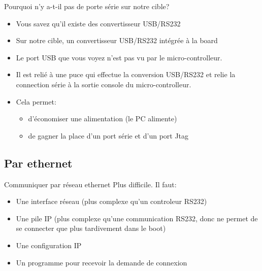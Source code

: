 \begin{frame}{Pourquoi n'y a-t-il pas de porte série sur notre cible?}
  \begin{itemize}
  \item Vous savez qu'il existe des convertisseur USB/RS232
  \item  Sur notre  cible, un  convertisseur USB/RS232  intégrée  à la
    board
  \item   Le  port  USB   que  vous   voyez  n'est   pas  vu   par  le
    micro-controlleur.
  \item Il est  relié à une puce qui  effectue la conversion USB/RS232
    et   relie  la   connection   série  à   la   sortie  console   du
    micro-controlleur.
  \item Cela permet:
    \begin{itemize}
    \item d'économiser une alimentation (le PC alimente)
    \item  de  gagner la  place  d'un port  série  et  d'un port  Jtag
    \end{itemize}
  \end{itemize}
\end{frame}

\subsection{Par ethernet}

\begin{frame}[fragile=singleslide]{Communiquer par réseau ethernet}
  Plus difficile. Il faut:
  \begin{itemize}
  \item Une interface réseau (plus complexe qu'un controleur RS232)
  \item Une pile IP (plus complexe qu'une communication RS232, donc ne
    permet de se connecter que plus tardivement dans le boot)
  \item Une configuration IP
  \item Un programme  pour recevoir la demande de connexion
  \end{itemize}
\end{frame}

